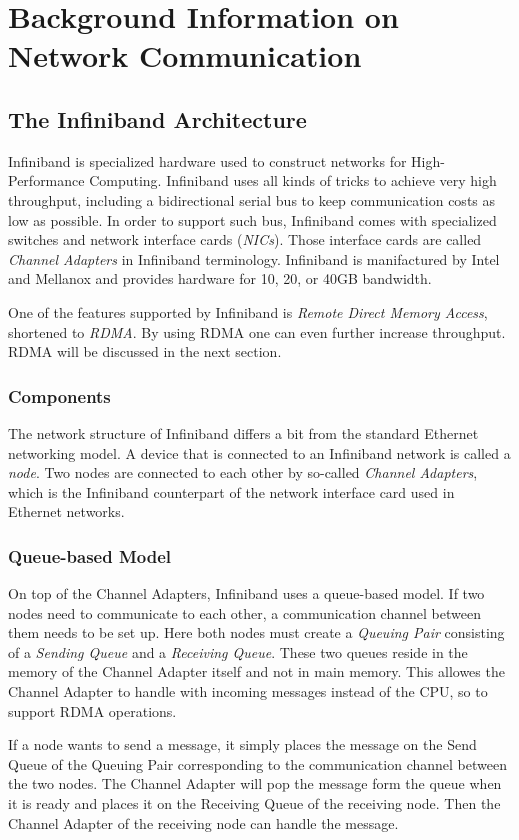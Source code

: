 \chapter{Background Information on Network Communication}

\section{The Infiniband Architecture}
Infiniband is specialized hardware used to construct networks for High-Performance Computing. Infiniband uses all kinds of tricks to achieve very high throughput, including a bidirectional serial bus to keep communication costs as low as possible. In order to support such bus, Infiniband comes with specialized switches and network interface cards (\emph{NICs}). Those interface cards are called \emph{Channel Adapters} in Infiniband terminology. Infiniband is manifactured by Intel and Mellanox and provides hardware for 10, 20, or 40GB bandwidth.

One of the features supported by Infiniband is \emph{Remote Direct Memory Access}, shortened to \emph{RDMA}. By using RDMA one can even further increase throughput. RDMA will be discussed in the next section.

\subsection{Components}
The network structure of Infiniband differs a bit from the standard Ethernet networking model. A device that is connected to an Infiniband network is called a \emph{node}. Two nodes are connected to each other by so-called \emph{Channel Adapters}, which is the Infiniband counterpart of the network interface card used in Ethernet networks. 

\subsection{Queue-based Model}
On top of the Channel Adapters, Infiniband uses a queue-based model. If two nodes need to communicate to each other, a communication channel between them needs to be set up. Here both nodes must create a \emph{Queuing Pair} consisting of a \emph{Sending Queue} and a \emph{Receiving Queue}. These two queues reside in the memory of the Channel Adapter itself and not in main memory. This allowes the Channel Adapter to handle with incoming messages instead of the CPU, so to support RDMA operations.

If a node wants to send a message, it simply places the message on the Send Queue of the Queuing Pair corresponding to the communication channel between the two nodes. The Channel Adapter will pop the message form the queue when it is ready and places it on the Receiving Queue of the receiving node. Then the Channel Adapter of the receiving node can handle the message. 

